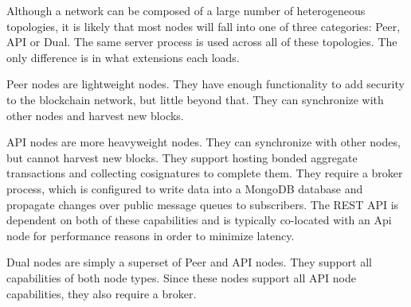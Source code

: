 Although a network can be composed of a large number of heterogeneous topologies, it is likely that most nodes will fall into one of three categories: Peer, API or Dual.
The same server process is used across all of these topologies.
The only difference is in what extensions each loads.

Peer nodes are lightweight nodes.
They have enough functionality to add security to the blockchain network, but little beyond that.
They can synchronize with other nodes and harvest new blocks.

API nodes are more heavyweight nodes.
They can synchronize with other nodes, but cannot harvest new blocks.
They support hosting bonded aggregate transactions and collecting cosignatures to complete them.
They require a broker process, which is configured to write data into a MongoDB database and propagate changes over public message queues to subscribers.
The REST API is dependent on both of these capabilities and is typically co-located with an Api node for performance reasons in order to minimize latency.

Dual nodes are simply a superset of Peer and API nodes.
They support all capabilities of both node types.
Since these nodes support all API node capabilities, they also require a broker.
